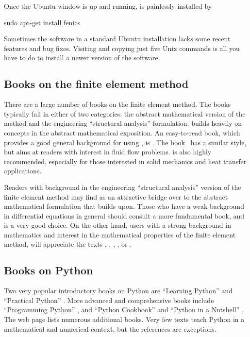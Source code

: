 Once the Ubuntu window
is up and running, \fenics{} is painlessly installed by
\vspace{4pt}
\begin{bash}
sudo apt-get install fenics
\end{bash}
Sometimes the \fenics{} software in a standard Ubuntu installation
lacks some recent features and bug fixes. Visiting
 and copying just five Unix
commands is all you have to do to install a newer version of the
software.

\subsection{Books on the finite element method}
\label{langtangen:appendix:books}
There are a large number of books on the finite element method.  The
books typically fall in either of two categories: the abstract
mathematical version of the method and the engineering ``structural
analysis'' formulation. \fenics{} builds heavily on concepts in the
abstract mathematical exposition.  An easy-to-read book, which
provides a good general background for using \fenics, is
\citet{Gockenbach2006}. The book~\citet{DoneaHuerta2003} has a similar
style, but aims at readers with interest in fluid flow
problems. \citet{Hughes1987} is also highly recommended, especially
for those interested in solid mechanics and heat transfer
applications.

Readers with background in the engineering ``structural analysis''
version of the finite element method may find \citet{Bickford1994} as
an attractive bridge over to the abstract mathematical formulation
that \fenics{} builds upon.  Those who have a weak background in
differential equations in general should consult a more fundamental
book, and \citet{ErikssonEstepHansboEtAl1996} is a very good
choice. On the other hand, \fenics{} users with a strong background in
mathematics and interest in the mathematical properties of the finite
element method, will appreciate the texts \citet{BrennerScott2008},
\citet{Braess2007}, \citet{ErnGuermond2004},
\citet{QuarteroniValli1994}, or \citet{Ciarlet2002}.

\subsection{Books on Python}
\label{langtangen:appendix:pybooks}

Two very popular introductory books on Python are ``Learning Python''
\citep{Lutz2007} and ``Practical Python'' \citep{Hetland2002}.  More
advanced and comprehensive books include ``Programming Python''
\citep{Lutz2006}, and ``Python Cookbook'' \citep{MartelliAscher2005}
and ``Python in a Nutshell'' \citep{Martelli2006}.  The web page
 lists numerous
additional books.  Very few texts teach Python in a mathematical and
numerical context, but the references
\citet{Langtangen2008,Langtangen2009a,Kiusalaas2005} are exceptions.

